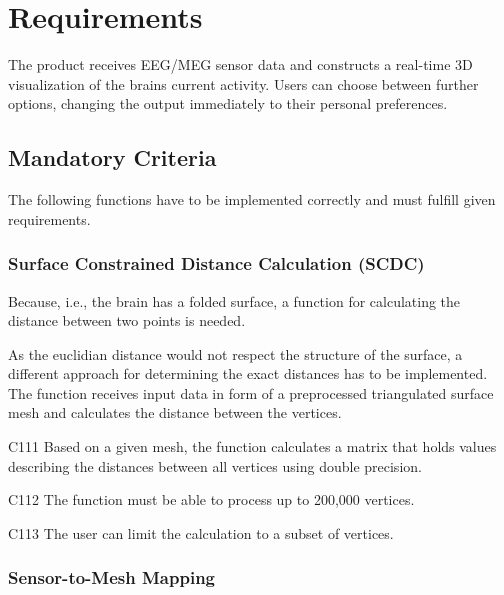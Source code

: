 \section{Requirements} 

	The product receives EEG/MEG sensor data and constructs a real-time 3D visualization of the brains current activity.
	Users can choose between further options, changing the output immediately to their personal preferences. 

\subsection{Mandatory Criteria}

	The following functions have to be implemented correctly and must fulfill given requirements.
		
\subsubsection{Surface Constrained Distance Calculation (SCDC)} \label{scdc}
	
	Because, i.e., the brain has a folded surface, a function for calculating the distance between two points is needed.
	
	As the euclidian distance would not respect the structure of the surface, a different approach for determining the exact 	distances has to be implemented.  
	The function receives input data in form of a preprocessed triangulated surface mesh and calculates the distance between 	the vertices.			
	
	
	\begin{aims}
	
		\item[C111] Based on a given mesh, the function calculates a matrix that holds values describing the distances between 						all vertices using double precision. 
		\item[C112] The function must be able to process up to 200,000 vertices.
		\item[C113] The user can limit the calculation to a subset of vertices. 
	
	\end{aims}

\subsubsection{Sensor-to-Mesh Mapping} \label{projection}

